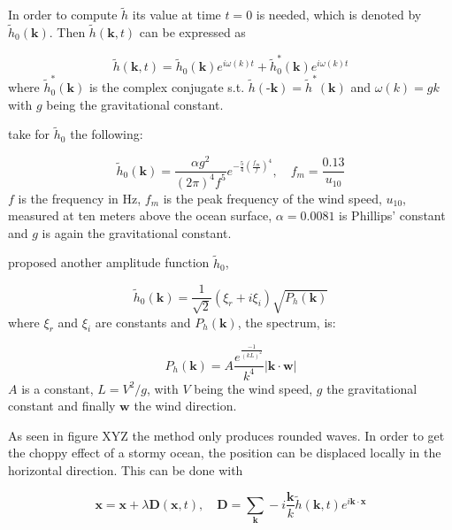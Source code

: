 In order to compute $\tilde{h}$ its value at time $t=0$ is needed, which is
denoted by $\tilde{h}_0(\textbf{k})$.  Then $\tilde{h}(\textbf{k}, t)$ can be
expressed as

\begin{equation}
    \tilde{h}(\textbf{k}, t) = \tilde{h}_0(\textbf{k}) e^{i\omega(k)t} +
    \tilde{h}_0^*(\textbf{k}) e^{i\omega(k)t}
\end{equation}
%
where $\tilde{h}_0^*(\textbf{k})$ is the complex conjugate s.t.
$\tilde{h}(\textbf{-k})=\tilde{h}^*(\textbf{k})$ and $\omega(k)=gk$ with $g$
being the gravitational constant.

\citeauthor{mastin1987fourier} take for $\tilde{h}_0$ the following:

\begin{equation}
    \tilde{h}_0(\textbf{k}) = \frac{\alpha g^2}{{(2\pi)}^4 f^5}
    e^{-\frac{5}{4}{(\frac{f_m}{f})}^4}, \quad f_m=\frac{0.13}{u_{10}}
\end{equation}
%
$f$ is the frequency in Hz, $f_m$ is the peak frequency of the wind speed,
$u_{10}$, measured at ten meters above the ocean surface, $\alpha=0.0081$ is
Phillips' constant and $g$ is again the gravitational constant.

\citeauthor{tessendorf2001simulating} proposed another amplitude function
$\tilde{h}_0$, 

\begin{equation}\label{eq:tessendorf_h0}
    \tilde{h}_0(\textbf{k}) = \frac{1}{\sqrt{2}}(\xi_r +
    i\xi_i)\sqrt{P_h(\textbf{k})}
\end{equation}
%
where $\xi_r$ and $\xi_i$ are constants and $P_h(\textbf{k})$, the spectrum, is:

\begin{equation}
    P_h(\textbf{k}) = A\frac{e^{\frac{-1}{{(kL)}^2}}}{k^4}
    |\textbf{k}\cdot\textbf{w}|
\end{equation}
%
$A$ is a constant, $L=V^2/g$, with $V$ being the wind speed, $g$ the
gravitational constant and finally $\textbf{w}$ the wind direction.

As seen in figure XYZ the method only produces rounded waves. In order to get
the choppy effect of a stormy ocean, the position can be displaced locally in
the horizontal direction. This can be done with

\begin{equation}
    \textbf{x} = \textbf{x} + \lambda \textbf{D}(\textbf{x}, t), \quad
    \textbf{D} = \sum_{\textbf{k}}^{} -i\frac{\textbf{k}}{k}
    \tilde{h}(\textbf{k},t) e^{i\textbf{k}\cdot\textbf{x}}
\end{equation}


